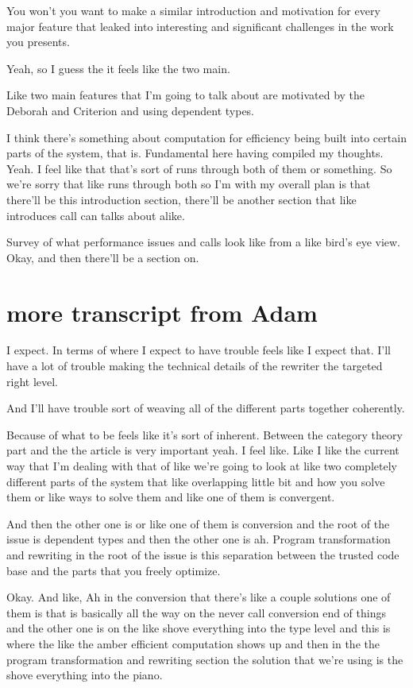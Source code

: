 \begin{subappendices}
You won't you want to make a similar introduction and motivation for every major feature that leaked into interesting and significant challenges in the work you presents.

Yeah, so I guess the it feels like the two main.

Like two main features that I'm going to talk about are motivated by the Deborah and Criterion and using dependent types.

I think there's something about computation for efficiency being built into certain parts of the system, that is. Fundamental here having compiled my thoughts. Yeah. I feel like that that's sort of runs through both of them or something. So we're sorry that like runs through both so I'm with my overall plan is that there'll be this introduction section, there'll be another section that like introduces call can talks about alike.

Survey of what performance issues and calls look like from a like bird's eye view. Okay, and then there'll be a section on.

\section{more transcript from Adam}
I expect. In terms of where I expect to have trouble feels like I expect that. I'll have a lot of trouble making the technical details of the rewriter the targeted right level.

And I'll have trouble sort of weaving all of the different parts together coherently.

Because of what to be feels like it's sort of inherent. Between the category theory part and the the article is very important yeah. I feel like. Like I like the current way that I'm dealing with that of like we're going to look at like two completely different parts of the system that like overlapping little bit and how you solve them or like ways to solve them and like one of them is convergent.

And then the other one is or like one of them is conversion and the root of the issue is dependent types and then the other one is ah. Program transformation and rewriting in the root of the issue is this separation between the trusted code base and the parts that you freely optimize.

Okay. And like, Ah in the conversion that there's like a couple solutions one of them is that is basically all the way on the never call conversion end of things and the other one is on the like shove everything into the type level and this is where the like the amber efficient computation shows up and then in the the program transformation and rewriting section the solution that we're using is the shove everything into the piano.


\end{subappendices}
